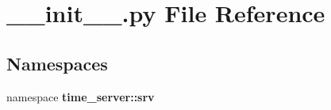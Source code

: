 \section{\-\_\-\-\_\-init\-\_\-\-\_\-.\-py \-File \-Reference}
\label{srv_2____init_____8py}
\subsection*{\-Namespaces}
\begin{DoxyCompactItemize}
\item 
namespace {\bf time\-\_\-server\-::srv}
\end{DoxyCompactItemize}
